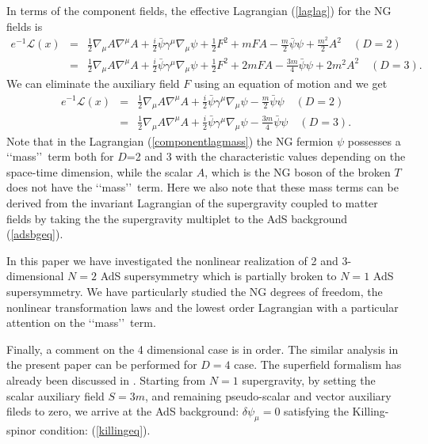 \documentclass[a4paper,12pt]{article}
\def\bpsi{\bar{\psi}}
\begin{document}
In terms of the component fields, the effective Lagrangian (\ref{laglag})
for the NG fields is
\begin{eqnarray}
 e^{-1}\mathcal{L}(x)
 &=& \frac{1}{2}\nabla_{\mu}A\nabla^{\mu}A
  + \frac{i}{2}\bpsi\gamma^{\mu}\nabla_{\mu}\psi + \frac{1}{2}F^{2}
  + mFA - \frac{m}{2}\bpsi\psi + \frac{m^2}{2}A^{2} \quad (D=2)  \\
 &=& \frac{1}{2}\nabla_{\mu}A\nabla^{\mu}A
  + \frac{i}{2}\bpsi\gamma^{\mu}\nabla_{\mu}\psi + \frac{1}{2}F^{2}
  + 2mFA - \frac{3m}{4}\bpsi\psi + 2m^{2}A^{2} \quad (D=3). \nonumber
  \label{componentlag}
\end{eqnarray}
We can eliminate the auxiliary field $F$ using an equation of motion and we get
\begin{eqnarray}
 e^{-1}\mathcal{L}(x)
 &=& \frac{1}{2}\nabla_{\mu}A\nabla^{\mu}A
  + \frac{i}{2}\bpsi\gamma^{\mu}\nabla_{\mu}\psi
  - \frac{m}{2}\bpsi\psi  \quad (D=2) \nonumber  \\
 &=& \frac{1}{2}\nabla_{\mu}A\nabla^{\mu}A
  + \frac{i}{2}\bpsi\gamma^{\mu}\nabla_{\mu}\psi
  - \frac{3m}{4}\bpsi\psi  \quad (D=3).
  \label{componentlagmass}
\end{eqnarray}
Note that in the Lagrangian (\ref{componentlagmass}) the NG fermion $\psi$
possesses a \lq\lq mass\rq\rq\ term both for $D$=2 and 3 with the 
characteristic values depending on the space-time dimension, while the scalar
$A$, which is the NG boson of the broken $T$ does not have the 
\lq\lq mass\rq\rq\  term. 
Here we also note that these mass terms can be derived from the invariant
Lagrangian of the supergravity coupled to matter fields by taking the
the supergravity multiplet to the AdS background (\ref{adsbgeq}).

\vspace{0.3cm}
\vspace{0.3cm}

In this paper we have investigated the nonlinear realization of 
2 and 3-dimensional $N=2$ AdS supersymmetry which is partially broken
to $N=1$ AdS supersymmetry. We have particularly studied the NG degrees
of freedom, the nonlinear transformation laws and the lowest order 
Lagrangian with a particular attention on the \lq\lq mass\rq\rq\  term. 

Finally, a comment on the 4 dimensional case is in order.
The similar analysis in the present paper can be performed for $D=4$
case. The superfield formalism has already been discussed in \cite{IS}. 
Starting from $N=1$ supergravity, by setting the scalar auxiliary field
$S=3m$, and remaining pseudo-scalar and vector auxiliary fileds to
zero, we arrive at the AdS background: $\delta\psi_\mu=0$ satisfying the
Killing-spinor condition: (\ref{killingeq}).
\end{document}
